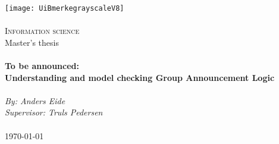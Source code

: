 %
%




\begin{titlepage}
\begin{center}
\texttt{[image: UiBmerkegrayscaleV8]} \\[0.5cm]
\paragraph*{}

\textsc{\Large Information science}\\[0.5cm]
\Large Master's thesis\\[0.4cm]
\HRule \\[0.4cm]
{
\huge \bfseries To be announced:  \\ \large Understanding and model checking Group Announcement Logic
}\\[0.5cm]
\HRule \\[1.0cm]

\emph{By: Anders Eide}\\
\emph{Supervisor: Truls Pedersen}\\

\paragraph*{}
\end{center}
\vfill
\begin{center}
{\large \today}
\end{center}
\end{titlepage}

\tableofcontents